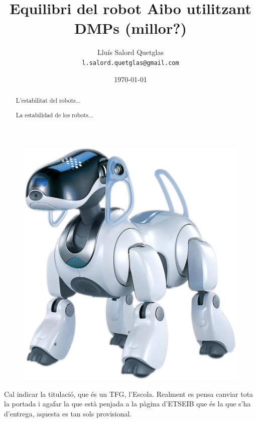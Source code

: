 \documentclass[12pt,a4paper,final,twoside]{article}
\title{Equilibri del robot Aibo utilitzant DMPs (millor?)}
\author{Lluís Salord Quetglas\\
		\texttt{l.salord.quetglas@gmail.com}\\}
\date{\today}
\begin{document}
\maketitle
\thispagestyle{empty}
\begin{figure}[h!]
\centering
\includegraphics[scale=0.1]{Imatges/ERS7.jpg} 
\end{figure}

Cal indicar la titulació, que és un TFG, l'Escola.
Realment es pensa canviar tota la portada i agafar la que està penjada a la pàgina d'ETSEIB que és la que s'ha d'entrega, aquesta es tan sols provisional.

\newpage
\paragraph{}
\thispagestyle{empty}
\cleardoublepage

\setcounter{page}{1} %

\begin{abstract}
L'estabilitat del robots...
\end{abstract}

\renewcommand{\abstractname}{Resumen}
\begin{abstract}
La estabilidad de los robots...
\end{abstract}
\end{document}
